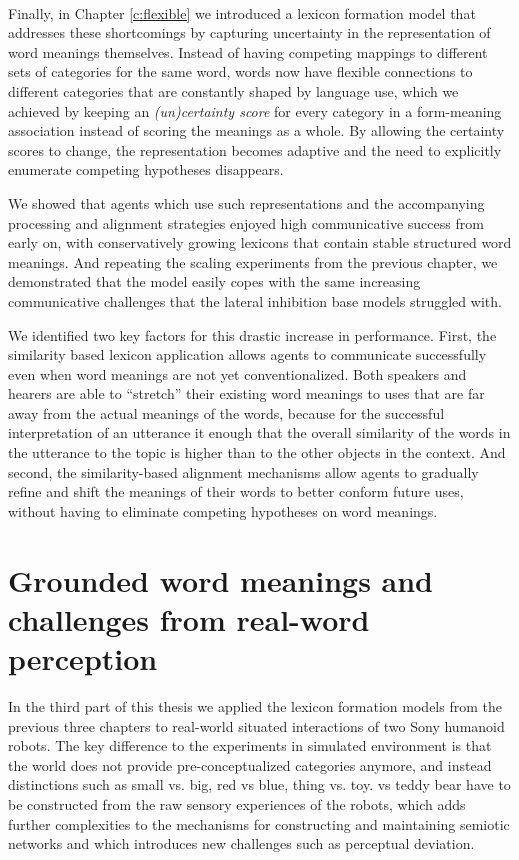 ~\\


 Finally, in
Chapter \ref{c:flexible} we introduced a lexicon formation model that
addresses these shortcomings by capturing uncertainty in the
representation of word meanings themselves. Instead of having
competing mappings to different sets of categories for the same word,
words now have flexible connections to different categories that are
constantly shaped by language use, which we achieved by keeping an
\emph{(un)certainty score} for every category in a form-meaning
association instead of scoring the meanings as a whole. By allowing
the certainty scores to change, the representation becomes adaptive
and the need to explicitly enumerate competing hypotheses disappears.

We showed that agents which use such representations and the
accompanying processing and alignment strategies enjoyed high
communicative success from early on, with conservatively growing
lexicons that contain stable structured word meanings. And repeating
the scaling experiments from the previous chapter, we demonstrated
that the model easily copes with the same increasing communicative
challenges that the lateral inhibition base models struggled with. 

We identified two key factors for this drastic increase in
performance. First, the similarity based lexicon application allows
agents to communicate successfully even when word meanings are not yet
conventionalized. Both speakers and hearers are able to ``stretch''
their existing word meanings to uses that are far away from the actual
meanings of the words, because for the successful interpretation of an
utterance it enough that the overall similarity of the words in the
utterance to the topic is higher than to the other objects in the
context. And second, the similarity-based alignment mechanisms allow
agents to gradually refine and shift the meanings of their words to
better conform future uses, without having to eliminate competing
hypotheses on word meanings.



\section{Grounded word meanings and challenges from real-word
  perception}

In the third part of this thesis we applied the lexicon formation
models from the previous three chapters to real-world situated
interactions of two Sony humanoid robots. The key difference to the
experiments in simulated environment is that the world does not
provide pre-conceptualized categories anymore, and instead
distinctions such as small vs. big, red vs blue, thing vs. toy. vs
teddy bear have to be constructed from the raw sensory experiences of
the robots, which adds further complexities to the mechanisms for
constructing and maintaining semiotic networks and which introduces
new challenges such as perceptual deviation.

